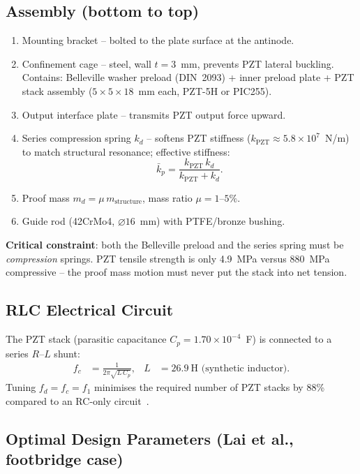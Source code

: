 \documentclass[12pt,a4paper]{article}
\begin{document}
\subsection*{Assembly (bottom to top)}
\begin{enumerate}
  \item Mounting bracket -- bolted to the plate surface at the antinode.
  \item Confinement cage -- steel, wall $t = 3$~mm, prevents PZT lateral buckling.
        Contains: Belleville washer preload (DIN~2093) + inner preload plate
        + PZT stack assembly ($5 \times 5 \times 18$~mm each, PZT-5H or PIC255).
  \item Output interface plate -- transmits PZT output force upward.
  \item Series compression spring $k_d$ -- softens PZT stiffness
        ($k_\text{PZT} \approx 5.8 \times 10^7$~N/m) to match structural resonance;
        effective stiffness:
        \begin{equation}
          \bar{k}_p = \frac{k_\text{PZT}\,k_d}{k_\text{PZT} + k_d}.
        \end{equation}
  \item Proof mass $m_d = \mu\,m_\text{structure}$, mass ratio $\mu = 1$--$5\%$.
  \item Guide rod (42CrMo4, $\varnothing 16$~mm) with PTFE/bronze bushing.
\end{enumerate}

\textbf{Critical constraint}: both the Belleville preload and the series spring
must be \emph{compression} springs.  PZT tensile strength is only 4.9~MPa
versus 880~MPa compressive -- the proof mass motion must never put the stack into
net tension.

\subsection*{RLC Electrical Circuit}

The PZT stack (parasitic capacitance $C_p = 1.70 \times 10^{-4}$~F) is connected
to a series $R$--$L$ shunt:
\begin{align}
  f_c &= \frac{1}{2\pi\sqrt{L\,C_p}}, & L &= 26.9\ \text{H (synthetic inductor)}.
\end{align}
Tuning $f_d = f_c = f_1$ minimises the required number of PZT stacks by 88\%
compared to an RC-only circuit~\cite{lai2021}.

\subsection*{Optimal Design Parameters (Lai et al., footbridge case)}
\end{document}
